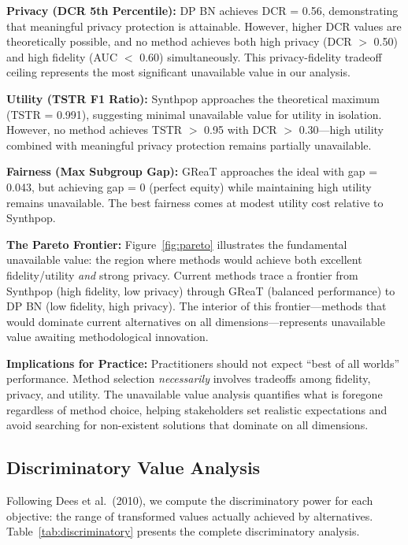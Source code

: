 \documentclass[12pt,a4paper]{article}
\begin{document}
\textbf{Privacy (DCR 5th Percentile):} DP BN achieves DCR = 0.56, demonstrating that meaningful privacy protection is attainable. However, higher DCR values are theoretically possible, and no method achieves both high privacy (DCR $>$ 0.50) and high fidelity (AUC $<$ 0.60) simultaneously. This privacy-fidelity tradeoff ceiling represents the most significant unavailable value in our analysis.

\textbf{Utility (TSTR F1 Ratio):} Synthpop approaches the theoretical maximum (TSTR = 0.991), suggesting minimal unavailable value for utility in isolation. However, no method achieves TSTR $>$ 0.95 with DCR $>$ 0.30---high utility combined with meaningful privacy protection remains partially unavailable.

\textbf{Fairness (Max Subgroup Gap):} GReaT approaches the ideal with gap = 0.043, but achieving gap = 0 (perfect equity) while maintaining high utility remains unavailable. The best fairness comes at modest utility cost relative to Synthpop.

\textbf{The Pareto Frontier:} Figure~\ref{fig:pareto} illustrates the fundamental unavailable value: the region where methods would achieve both excellent fidelity/utility \textit{and} strong privacy. Current methods trace a frontier from Synthpop (high fidelity, low privacy) through GReaT (balanced performance) to DP BN (low fidelity, high privacy). The interior of this frontier---methods that would dominate current alternatives on all dimensions---represents unavailable value awaiting methodological innovation.

\textbf{Implications for Practice:} Practitioners should not expect ``best of all worlds'' performance. Method selection \textit{necessarily} involves tradeoffs among fidelity, privacy, and utility. The unavailable value analysis quantifies what is foregone regardless of method choice, helping stakeholders set realistic expectations and avoid searching for non-existent solutions that dominate on all dimensions.

\subsection{Discriminatory Value Analysis}

Following Dees et al.\ (2010), we compute the discriminatory power for each objective: the range of transformed values actually achieved by alternatives. Table~\ref{tab:discriminatory} presents the complete discriminatory analysis.
\end{document}
